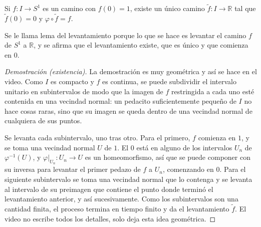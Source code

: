 \documentclass[11pt]{article}
\begin{document}
\begin{lema}
Si $f\colon I\to S^1$ es un camino con $f(0)=1$, existe un único camino $\tilde f\colon I\to\mathbb{R}$ tal que $\tilde f(0)=0$ y $\varphi\circ\tilde f=f$.
\end{lema}

Se le llama lema del levantamiento porque lo que se hace es levantar el camino $f$ de $S^1$ a $\mathbb{R}$, y se afirma que el levantamiento existe, que es único y que comienza en $0$.

\begin{proof}[Demostración (existencia)]
La demostración es muy geométrica y así se hace en el video. Como $I$ es compacto y $f$ es continua, se puede subdividir el intervalo unitario en subintervalos de modo que la imagen de $f$ restringida a cada uno esté contenida en una vecindad normal: un pedacito suficientemente pequeño de $I$ no hace cosas raras, sino que su imagen se queda dentro de una vecindad normal de cualquiera de sus puntos.

Se levanta cada subintervalo, uno tras otro. Para el primero, $f$ comienza en $1$, y se toma una vecindad normal $U$ de $1$. El $0$ está en alguno de los intervalos $U_n$ de $\varphi^{-1}(U)$, y $\varphi|_{U_n}\colon U_n\to U$ es un homeomorfismo, así que se puede componer con su inversa para levantar el primer pedazo de $f$ a $U_n$, comenzando en $0$. Para el siguiente subintervalo se toma una vecindad normal que lo contenga y se levanta al intervalo de su preimagen que contiene el punto donde terminó el levantamiento anterior, y así sucesivamente. Como los subintervalos son una cantidad finita, el proceso termina en tiempo finito y da el levantamiento $\tilde f$. El video no escribe todos los detalles, solo deja esta idea geométrica.
\end{proof}
\end{document}
